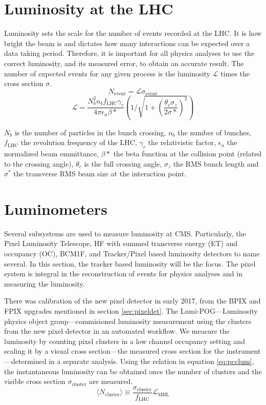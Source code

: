 \section{Luminosity at the LHC}
Luminosity sets the scale for the number of events recorded at the LHC. It is how bright the beam is and dictates how many interactions can be expected over a data taking period. Therefore, it is important for all physics analyses to use the correct luminosity, and its measured error, to obtain an accurate result. The number of expected events for any given process is the luminosity $\mathcal{L}$ times the cross section $\sigma$.  
\begin{equation}
N_{\text{event}} = \mathcal{L} \sigma_{\text{event}}
\end{equation}
\begin{equation}
\mathcal{L} = \frac{N_b^2 n_b f_\text{LHC} \gamma_r}{4\pi\epsilon_n \beta*}\left( 1 / \sqrt{1+ (\frac{\theta_c \sigma_z}{2\sigma*})^2} \right)
\end{equation}

$N_b$ is the number of particles in the bunch crossing, $n_b$ the number of bunches, $f_{\text{LHC}}$ the revolution frequency of the LHC, $\gamma_r$ the relativistic factor, $\epsilon_n$ the normalized beam emmittance, $\beta*$ the beta function at the collision point (related to the crossing angle), $\theta_c$ is the full crossing angle, $\sigma_z$ the RMS bunch length and $\sigma^*$ the transverse RMS beam size at the interaction point.

\section{Luminometers}
Several subsystems are used to measure luminosity at CMS. Particularly, the Pixel Luminosity Telescope, HF with summed transverse energy (ET) and occupancy (OC), BCM1F, and Tracker/Pixel based luminosity detectors to name several. 
In this section, the tracker based luminosity will be the focus. The pixel system is integral in the reconstruction of events for physics analyses and in measuring the luminosity.

There was calibration of the new pixel detector in early 2017, from the BPIX and FPIX upgrades mentioned in section \ref{sec:pixeldet}. The Lumi-POG---Luminosity physics object group---commisioned luminosity measurement using the clusters from the new pixel detector in an automated workflow. 
We measure the luminosity by counting pixel clusters in a low channel occupancy setting and scaling it by a visual cross section---the measured cross section for the instrument---determined in a separate analysis. Using the relation in equation \ref{eq:pcclum}, the instantaneous luminosity can be obtained once the number of clusters and the visible cross section $\sigma_\text{cluster}$ are measured. 
\begin{equation}
\label{eq:pcclum}
\langle N_{\text{cluster}}\rangle\equiv\frac{\sigma_{\text{cluster}}}{f_{\text{LHC}}}\mathcal{L}_{\text{SBIL}}
\end{equation}

